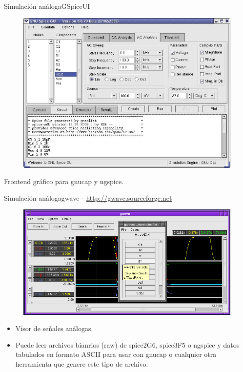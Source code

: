 \documentclass{beamer}
\begin{document}
\begin{frame}{Simulación análoga}{GSpiceUI}
  \begin{figure}[!h]
    \centering
    \includegraphics[scale=0.3]{img/GSpiceUI.jpg}
  \end{figure}
  Frontend gráfico para gnucap y ngspice.
\end{frame}

\begin{frame}{Simulación análoga}{\alert{gwave} - \url{http://gwave.sourceforge.net}}
  \begin{figure}[!h]
    \centering
    \includegraphics[scale=0.25]{img/gwave.png}
  \end{figure}
  \begin{itemize}
  \item Visor de señales análogas.
  \item Puede leer archivos bianrios (raw) de spice2G6, spice3F5 o ngspice y datos tabulados en formato ASCII para usar con gnucap o cualquier otra herramienta que genere este tipo de archivo.
  \end{itemize}
\end{frame}
\end{document}

